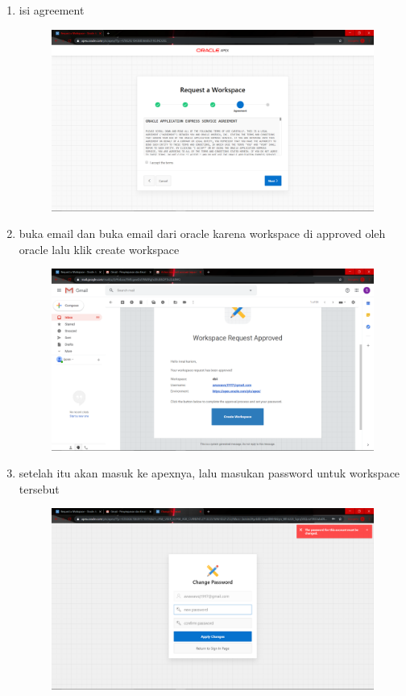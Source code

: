 \begin{enumerate}
\item isi agreement

\begin{figure}[H]
    \centering
    \includegraphics[scale=0.1]{figures/6}
    \caption{}
    \label{Figureanaconda5}
\end{figure}


\item buka email dan buka email dari oracle karena workspace di approved oleh oracle lalu klik create workspace
\begin{figure}[H]
    \centering
    \includegraphics[scale=0.1]{figures/7}
    \caption{}
    \label{Figureanaconda6}
\end{figure}

\item setelah itu akan masuk ke apexnya, lalu masukan password untuk workspace tersebut

\begin{figure}[H]
    \centering
    \includegraphics[scale=0.1]{figures/8}
    \caption{}
    \label{Figureanaconda7}
\end{figure}


\end{enumerate}
